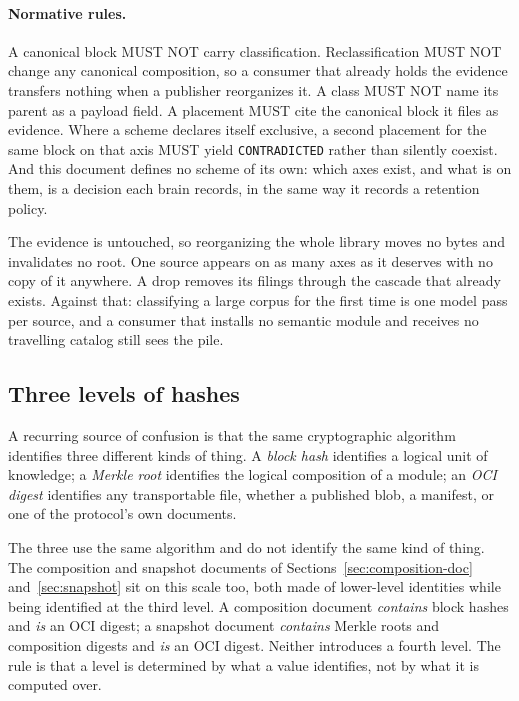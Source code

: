 \documentclass[11pt,a4paper]{article}
\begin{document}
\paragraph{Normative rules.}
A canonical block MUST NOT carry classification. Reclassification MUST NOT
change any canonical composition, so a consumer that already holds the evidence
transfers nothing when a publisher reorganizes it. A class MUST NOT name its
parent as a payload field. A placement MUST cite the canonical block it files as
evidence. Where a scheme declares itself exclusive, a second placement for the
same block on that axis MUST yield \texttt{CONTRADICTED} rather than silently
coexist. And this document defines no scheme of its own: which axes exist, and
what is on them, is a decision each brain records, in the same way it records a
retention policy.

\begin{callout}[title={What this buys, and what it costs}]
The evidence is untouched, so reorganizing the whole library moves no bytes and
invalidates no root. One source appears on as many axes as it deserves with no
copy of it anywhere. A drop removes its filings through the cascade that already
exists. Against that: classifying a large corpus for the first time is one model
pass per source, and a consumer that installs no semantic module and receives no
travelling catalog still sees the pile.
\end{callout}

\subsection{Three levels of hashes}
\label{sec:hashes}

A recurring source of confusion is that the same cryptographic algorithm
identifies three different kinds of thing. A \emph{block hash} identifies a
logical unit of knowledge; a \emph{Merkle root} identifies the logical
composition of a module; an \emph{OCI digest} identifies any transportable
file, whether a published blob, a manifest, or one of the protocol's own
documents.

The three use the same algorithm and do not identify the same kind of thing.
The composition and snapshot documents of Sections~\ref{sec:composition-doc}
and~\ref{sec:snapshot} sit on this scale too, both made of lower-level
identities while being identified at the third level.
A composition document \emph{contains} block hashes and \emph{is} an OCI digest;
a snapshot document \emph{contains} Merkle roots and composition digests and
\emph{is} an OCI digest. Neither introduces a fourth level. The rule is that a
level is determined by what a value identifies, not by what it is computed over.
\end{document}
